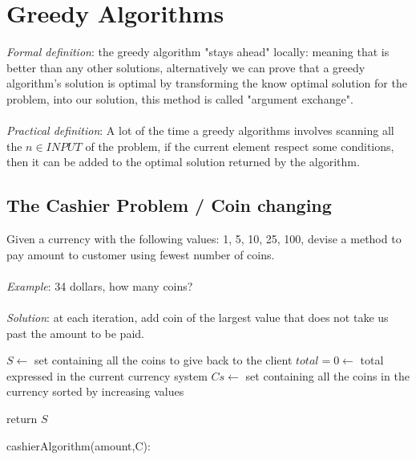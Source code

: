 \section{Greedy Algorithms}

\emph{Formal definition}: the greedy algorithm "stays ahead" locally: meaning that is better than any other solutions, alternatively we can prove that a greedy algorithm's solution is optimal by transforming the know optimal solution for the problem, into our solution, this method is called "argument exchange".\\\\\emph{Practical definition}: A lot of the time a greedy algorithms involves scanning all the $n \in INPUT$ of the problem, if the current element respect some conditions, then it can be added to the optimal solution returned by the algorithm.

\subsection{The Cashier Problem / Coin changing}

Given a currency with the following values: 1, 5, 10, 25, 100, devise a method to pay amount to customer using fewest number of coins.\\\\
\emph{Example}: 34 dollars, how many coins?\\\\
\emph{Solution}: at each iteration, add coin of the largest value that does not take us past the amount to be paid.

\begin{algorithm}[H]
    \SetAlgoLined
    \small
    \BlankLine


    $S \leftarrow$ set containing all the coins to give back to the client\;
    $total = 0 \leftarrow$ total expressed in the current currency system\;
    $Cs \leftarrow$ set containing all the coins in the currency sorted by increasing values\;

    \BlankLine
    \BlankLine

    return $S$\;
    \caption{cashierAlgorithm(amount,C):}
\end{algorithm}

